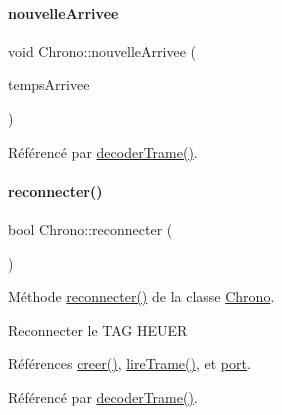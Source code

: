 \paragraph{\texorpdfstring{nouvelle\+Arrivee}{nouvelleArrivee}}
{\footnotesize\ttfamily void Chrono\+::nouvelle\+Arrivee (\begin{DoxyParamCaption}\item[{Q\+String}]{temps\+Arrivee }\end{DoxyParamCaption})\hspace{0.3cm}{\ttfamily [signal]}}



Référencé par \hyperlink{class_chrono_a9a66b4e81385e2c354805548b94cdfb6}{decoder\+Trame()}.

\mbox{\label{class_chrono_a80305a5dae33e8cd99604e809589564b}} 
\paragraph{\texorpdfstring{reconnecter()}{reconnecter()}}
{\footnotesize\ttfamily bool Chrono\+::reconnecter (\begin{DoxyParamCaption}{ }\end{DoxyParamCaption})\hspace{0.3cm}{\ttfamily [private]}}



Méthode \hyperlink{class_chrono_a80305a5dae33e8cd99604e809589564b}{reconnecter()} de la classe \hyperlink{class_chrono}{Chrono}. 

Reconnecter le T\+AG H\+E\+U\+ER 

Références \hyperlink{class_chrono_a74d85a4e856e2e59afacaa061feb7b75}{creer()}, \hyperlink{class_chrono_ae7c3c8494ace02f4c9dd714f6f0e574a}{lire\+Trame()}, et \hyperlink{class_chrono_aca5fbe0eebd7f876f954d4a99c564167}{port}.



Référencé par \hyperlink{class_chrono_a9a66b4e81385e2c354805548b94cdfb6}{decoder\+Trame()}.


